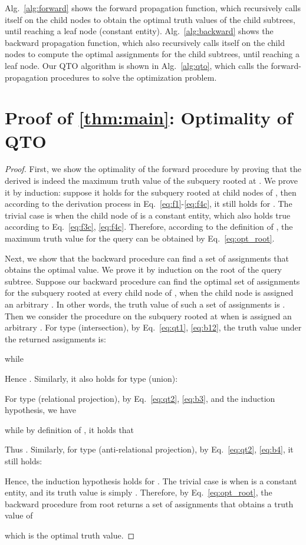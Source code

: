 Alg.~\ref{alg:forward} shows the forward propagation function, which recursively calls itself on the child nodes to obtain the optimal truth values of the child subtrees, until reaching a leaf node (constant entity).
Alg.~\ref{alg:backward} shows the backward propagation function, which also recursively calls itself on the child nodes to compute the optimal assignments for the child subtrees, until reaching a leaf node.
Our QTO algorithm is shown in Alg.~\ref{alg:qto}, which calls the forward-propagation procedures to solve the optimization problem.

\section{Proof of \cref{thm:main}: Optimality of QTO}
\label{app:thm}

\thm*
\begin{proof}
    First, we show the optimality of the forward procedure by proving that the derived  is indeed the maximum truth value of the subquery rooted at .
    We prove it by induction: suppose it holds for the subquery rooted at child nodes of , then according to the derivation process in Eq.~\ref{eq:f1}-\ref{eq:f4c}, it still holds for .
    The trivial case is when the child node of  is a constant entity, which also holds true according to Eq.~\ref{eq:f3c}, \ref{eq:f4c}.
    Therefore, according to the definition of , the maximum truth value for the query can be obtained by Eq.~\ref{eq:opt_root}.

    Next, we show that the backward procedure can find a set of assignments that obtains the optimal value.
    We prove it by induction on the root of the query subtree.
    Suppose our backward procedure can find the optimal set of assignments for the subquery rooted at every child node  of , when the child node is assigned an arbitrary . In other words, the truth value of such a set of assignments is .
    Then we consider the procedure on the subquery rooted at  when  is assigned an arbitrary . For type  (intersection), by Eq.~\ref{eq:qt1}, \ref{eq:b12}, the truth value  under the returned assignments is:
    
    while
    
    Hence . Similarly, it also holds for type  (union):
    
    For type  (relational projection), by Eq.~\ref{eq:qt2}, \ref{eq:b3}, and the induction hypothesis, we have
    
    while by definition of , it holds that
    
    Thus . Similarly, for type  (anti-relational projection), by Eq.~\ref{eq:qt2}, \ref{eq:b4}, it still holds:
    
    Hence, the induction hypothesis holds for .
    The trivial case is when  is a constant entity, and its truth value is simply .
    Therefore, by Eq.~\ref{eq:opt_root}, the backward procedure from root  returns a set of assignments that obtains a truth value of 
    
    which is the optimal truth value.
\end{proof}

